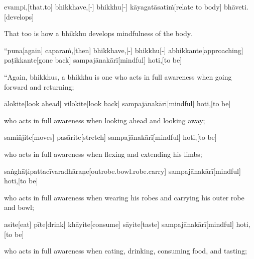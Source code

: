 \begin{samepage}
\begingl[glneveryline={\PaliGlossA,\PaliGlossB}]
evampi,[that.to] bhikkhave,[-] bhikkhu[-] kāyagatāsatiṁ[relate to body] bhāveti.[develops]
\endgl
\nopagebreak
\linespread{0.5}
\begin{spacin}{0.2}
{\PaliGlossFT That too is how a bhikkhu develops mindfulness of the body.}
\end{spacin}
\vskip 12pt
\end{samepage}
\vskip 0.05in
\begin{samepage}
\begingl[glneveryline={\PaliGlossA,\PaliGlossB}]
“puna[again] caparaṁ,[then] bhikkhave,[-] bhikkhu[-] abhikkante[approaching] paṭikkante[gone back] sampajānakārī[mindful] hoti,[to be]
\endgl
\nopagebreak
\linespread{0.5}
\begin{spacin}{0.2}
{\PaliGlossFT “Again, bhikkhus, a bhikkhu is one who acts in full awareness when going forward and returning;}
\end{spacin}
\vskip 12pt
\end{samepage}
\begin{samepage}
\begingl[glneveryline={\PaliGlossA,\PaliGlossB}]
ālokite[look ahead] vilokite[look back] sampajānakārī[mindful] hoti,[to be]
\endgl
\nopagebreak
\linespread{0.5}
\begin{spacin}{0.2}
{\PaliGlossFT who acts in full awareness when looking ahead and looking away;}
\end{spacin}
\vskip 12pt
\end{samepage}
\begin{samepage}
\begingl[glneveryline={\PaliGlossA,\PaliGlossB}]
samiñjite[moves] pasārite[stretch] sampajānakārī[mindful] hoti,[to be]
\endgl
\nopagebreak
\linespread{0.5}
\begin{spacin}{0.2}
{\PaliGlossFT who acts in full awareness when flexing and extending his limbs;}
\end{spacin}
\vskip 12pt
\end{samepage}
\begin{samepage}
\begingl[glneveryline={\PaliGlossA,\PaliGlossB}]
saṅghāṭipattacīvaradhāraṇe[outrobe.bowl.robe.carry] sampajānakārī[mindful] hoti,[to be]
\endgl
\nopagebreak
\linespread{0.5}
\begin{spacin}{0.2}
{\PaliGlossFT who acts in full awareness when wearing his robes and carrying his outer robe and bowl;}
\end{spacin}
\vskip 12pt
\end{samepage}
\begin{samepage}
\begingl[glneveryline={\PaliGlossA,\PaliGlossB}]
asite[eat] pīte[drink] khāyite[consume] sāyite[taste] sampajānakārī[mindful] hoti,[to be]
\endgl
\nopagebreak
\linespread{0.5}
\begin{spacin}{0.2}
{\PaliGlossFT who acts in full awareness when eating, drinking, consuming food, and tasting;}
\end{spacin}
\vskip 12pt
\end{samepage}
